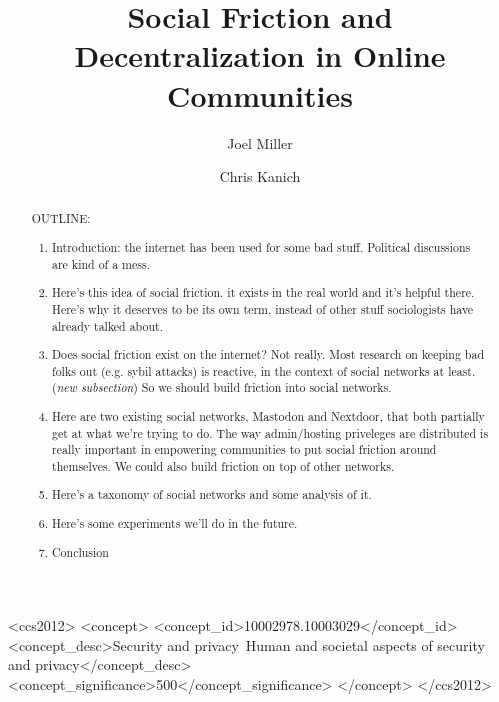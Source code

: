 \documentclass[sigconf,authordraft]{acmart}
\begin{document}
\title{Social Friction and Decentralization in Online Communities}

%

\author{Joel Miller}

\author{Chris Kanich}







\begin{abstract}
OUTLINE:
\begin{enumerate}
    \item Introduction: the internet has been used for some bad stuff. Political discussions are kind of a mess.\\
    \item Here's this idea of social friction. it exists in the real world and it's helpful there. Here's why it deserves to be its own term, instead of other stuff sociologists have already talked about.\\
    \item Does social friction exist on the internet? Not really. Most research on keeping bad folks out (e.g. sybil attacks) is reactive, in the context of social networks at least. (\textit{new subsection}) So we should build friction into social networks.\\ 
    \item Here are two existing social networks, Mastodon and Nextdoor, that both partially get at what we're trying to do. The way admin/hosting priveleges are distributed is really important in empowering communities to put social friction around themselves. We could also build friction on top of other networks. \\
    \item Here's a taxonomy of social networks and some analysis of it. \\
    \item Here's some experiments we'll do in the future.\\
    \item Conclusion \\
\end{enumerate}
\end{abstract}


\begin{CCSXML}
<ccs2012>
   <concept>
       <concept_id>10002978.10003029</concept_id>
       <concept_desc>Security and privacy~Human and societal aspects of security and privacy</concept_desc>
       <concept_significance>500</concept_significance>
       </concept>
 </ccs2012>
\end{CCSXML}
\end{document}
